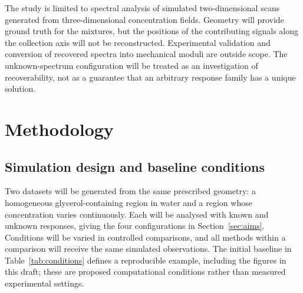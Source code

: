\documentclass[11pt]{article}
\begin{document}
The study is limited to spectral analysis of simulated two-dimensional scans generated from three-dimensional concentration fields. Geometry will provide ground truth for the mixtures, but the positions of the contributing signals along the collection axis will not be reconstructed. Experimental validation and conversion of recovered spectra into mechanical moduli are outside scope. The unknown-spectrum configuration will be treated as an investigation of recoverability, not as a guarantee that an arbitrary response family has a unique solution.

\clearpage
\section{Methodology}
\subsection{Simulation design and baseline conditions}

Two datasets will be generated from the same prescribed geometry: a homogeneous glycerol-containing region in water and a region whose concentration varies continuously. Each will be analysed with known and unknown responses, giving the four configurations in Section~\ref{sec:aims}. Conditions will be varied in controlled comparisons, and all methods within a comparison will receive the same simulated observations. The initial baseline in Table~\ref{tab:conditions} defines a reproducible example, including the figures in this draft; these are proposed computational conditions rather than measured experimental settings.
\end{document}
